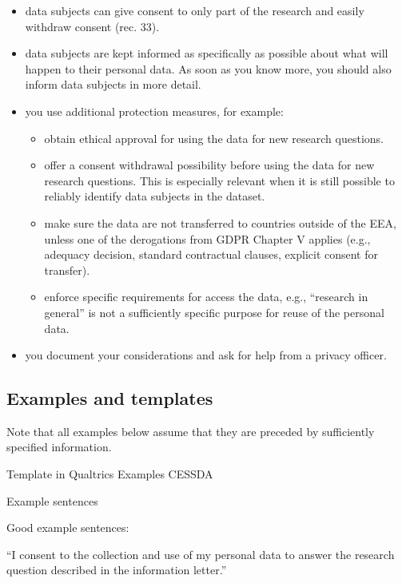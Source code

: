\documentclass[
]{book}
\providecommand{\tightlist}{%
  \setlength{\itemsep}{0pt}\setlength{\parskip}{0pt}}
\begin{document}
\begin{itemize}
\tightlist
\item
  data subjects can give consent to only part of the research and easily
  withdraw consent
  (rec. 33).
\item
  data subjects are kept informed as specifically as possible about what will
  happen to their personal data. As soon as you know more, you should also inform
  data subjects in more detail.
\item
  you use additional protection measures, for example:

  \begin{itemize}
  \tightlist
  \item
    obtain ethical approval for using the data for new research questions.
  \item
    offer a consent withdrawal possibility before using the data for new research
    questions. This is especially relevant when it is still possible to reliably
    identify data subjects in the dataset.
  \item
    make sure the data are not transferred to countries outside of the EEA,
    unless one of the derogations from GDPR
    Chapter V
    applies (e.g., adequacy decision, standard contractual clauses, explicit
    consent for transfer).
  \item
    enforce specific requirements for access the data, e.g., ``research in general''
    is not a sufficiently specific purpose for reuse of the personal data.
  \end{itemize}
\item
  you document your considerations and ask for help from a
  privacy officer.
\end{itemize}

\hypertarget{examples-and-templates}{%
\subsection{Examples and templates}\label{examples-and-templates}}

Note that all examples below assume that they are preceded by
sufficiently specified information.

Template in Qualtrics
Examples CESSDA

Example sentences

Good example sentences:

``I consent to the collection and use of my personal data to answer the
research question described in the information letter.''
\end{document}
